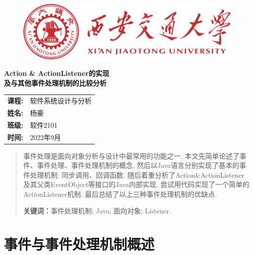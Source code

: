 \documentclass[12pt, a4paper, oneside]{ctexart}
\begin{document}
\thispagestyle{empty}

\begin{figure}[t]
    \centering
    \includegraphics[width=13cm]{../pic/logo1.png}
\end{figure}

\vspace*{\fill}
    \begin{center}
        \Huge\textbf{Action \& ActionListener的实现\\及与其他事件处理机制的比较分析}
    \end{center}
\vspace*{\fill}

\begin{table}[b]
    \centering
    \large
    \begin{tabular}{ll}
        \textbf{课程:} & 软件系统设计与分析 \\
        \textbf{姓名:} & 杨豪 \\
        \textbf{班级:} & 软件2101 \\
        \textbf{时间:} & 2022年9月 \\
    \end{tabular}
\end{table}

\newpage

\thispagestyle{empty}
\begin{abstract}
    事件处理是面向对象分析与设计中最常用的功能之一. 本文先简单论述了事件、事件处理、事件处理机制的概念, 然后以Java语言分别实现了基本的事件处理机制: 
    同步调用、回调函数. 随后着重分析了Action\&ActionListener及其父类EventObject等接口的Java内部实现, 尝试用代码实现了一个简单的ActionListener机制. 
    最后总结了以上三种事件处理机制的优缺点. 
    \par\textbf{关键词：}事件处理机制; Java; 面向对象; Listener. 
\end{abstract}

\newpage
{}
\setcounter{page}{1}
\tableofcontents
\newpage
\setcounter{page}{1}

\section{事件与事件处理机制概述}
\end{document}
